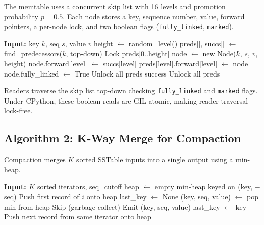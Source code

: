 \documentclass[oneside,a4paper,12pt]{book}
\begin{document}
The memtable uses a concurrent skip list with 16 levels and promotion probability $p = 0.5$. Each node stores a key, sequence number, value, forward pointers, a per-node lock, and two boolean flags (\texttt{fully\_linked}, \texttt{marked}).

\begin{algorithm}[H]
\caption{Skip List Insert}
\begin{algorithmic}[1]
\STATE \textbf{Input:} key $k$, seq $s$, value $v$
\STATE height $\leftarrow$ random\_level()
\REPEAT
    \STATE preds[], succs[] $\leftarrow$ find\_predecessors($k$, top-down)
    \STATE Lock preds[0..height]
        \STATE node $\leftarrow$ new Node($k$, $s$, $v$, height)
            \STATE node.forward[level] $\leftarrow$ succs[level]
            \STATE preds[level].forward[level] $\leftarrow$ node
        \ENDFOR
        \STATE node.fully\_linked $\leftarrow$ True
        \STATE Unlock all preds
        \RETURN success
    \ENDIF
    \STATE Unlock all preds
\end{algorithmic}
\end{algorithm}

Readers traverse the skip list top-down checking \texttt{fully\_linked} and \texttt{marked} flags. Under CPython, these boolean reads are GIL-atomic, making reader traversal lock-free.

\subsection{Algorithm 2: K-Way Merge for Compaction}

Compaction merges $K$ sorted SSTable inputs into a single output using a min-heap.

\begin{algorithm}[H]
\caption{K-Way Merge with Deduplication}
\begin{algorithmic}[1]
\STATE \textbf{Input:} $K$ sorted iterators, seq\_cutoff
\STATE heap $\leftarrow$ empty min-heap keyed on (key, $-$seq)
    \STATE Push first record of $i$ onto heap
\ENDFOR
\STATE last\_key $\leftarrow$ None
    \STATE (key, seq, value) $\leftarrow$ pop min from heap
            \STATE Skip (garbage collect)
        \ELSE
            \STATE Emit (key, seq, value)
        \ENDIF
        \STATE last\_key $\leftarrow$ key
    \ENDIF
    \STATE Push next record from same iterator onto heap
\ENDWHILE
\end{algorithmic}
\end{algorithm}
\end{document}

